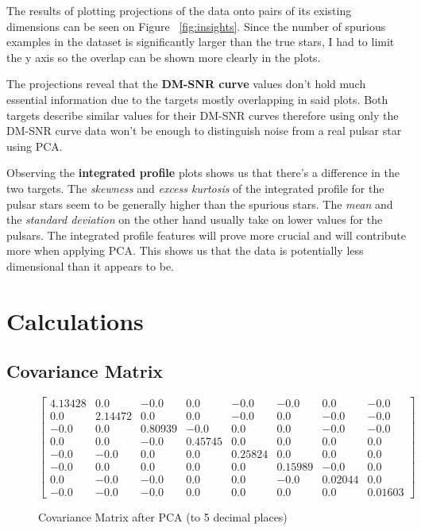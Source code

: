\documentclass[a4paper,12pt]{article}
\begin{document}
    The results of plotting projections of the data onto pairs of its existing dimensions can be seen on Figure ~\ref{fig:insights}. Since the number of spurious examples in the dataset is significantly larger than the true stars, I had to limit the y axis so the overlap can be shown more clearly in the plots. \par
    The projections reveal that the \textbf{DM-SNR curve} values don’t hold much essential information due to the targets mostly overlapping in said plots. Both targets describe similar values for their DM-SNR curves therefore using only the DM-SNR curve data won’t be enough to distinguish noise from a real pulsar star using PCA. \par
    Observing the \textbf{integrated profile} plots shows us that there’s a difference in the two targets. The \textit{skewness} and \textit{excess kurtosis} of the integrated profile for the pulsar stars seem to be generally higher than the spurious stars. The \textit{mean} and the \textit{standard deviation} on the other hand usually take on lower values for the pulsars. The integrated profile features will prove more crucial and will contribute more when applying PCA. This shows us that the data is potentially less dimensional than it appears to be.

    \newpage

    \section{Calculations}

    \subsection{Covariance Matrix}

    \setcounter{MaxMatrixCols}{20}
    \begin{figure}[h]
        \centering
        \begin{math}
            \begin{bmatrix}
                4.13428&0.0&-0.0&0.0&-0.0&-0.0&0.0&-0.0\\
                0.0&2.14472&0.0&0.0&-0.0&0.0&-0.0&-0.0\\
                -0.0&0.0&0.80939&-0.0&0.0&0.0&-0.0&-0.0\\
                0.0&0.0&-0.0&0.45745&0.0&0.0&0.0&0.0\\
                -0.0&-0.0&0.0&0.0&0.25824&0.0&0.0&0.0\\
                -0.0&0.0&0.0&0.0&0.0&0.15989&-0.0&0.0\\
                0.0&-0.0&-0.0&0.0&0.0&-0.0&0.02044&0.0\\
                -0.0&-0.0&-0.0&0.0&0.0&0.0&0.0&0.01603
            \end{bmatrix}
        \end{math}
        \caption{Covariance Matrix after PCA (to 5 decimal places)}
    \end{figure}
\end{document}
